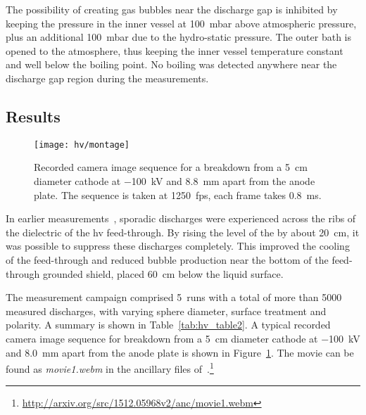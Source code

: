 The possibility of creating gas bubbles near the discharge gap is inhibited by keeping the pressure in the inner vessel at \SI{100}{\milli\bar} above atmospheric pressure, plus an additional \SI{100}{\milli\bar} due to the hydro-static pressure.
The outer bath is opened to the atmosphere, thus keeping the inner vessel temperature constant and well below the boiling point.
No boiling was detected anywhere near the discharge gap region during the measurements.


\subsection{Results}
\label{sec:studies_hv_results}

\begin{figure}[htb]
	\centering	
	\texttt{[image: hv/montage]}
	\caption[ test high-speed footage]{%
		Recorded camera image sequence for a breakdown from a \SI{5}{\centi\metre} diameter cathode at \SI{-100}{\kilo\volt} and \SI{8.8}{\milli\metre} apart from the anode plate.
		The sequence is taken at \SI{1250}{fps}, each frame takes \SI{0.8}{\milli\second}.
	}
	\label{fig:hv_images}
\end{figure}

In earlier measurements~\cite{breakdown_14}, sporadic discharges were experienced across the ribs of the dielectric of the \gls{hv} feed-through.
By rising the level of the \lar{} by about \SI{20}{\centi\metre}, it was possible to suppress these discharges completely.
This improved the cooling of the feed-through and reduced bubble production near the bottom of the feed-through grounded shield, placed \SI{60}{\centi\metre} below the liquid surface. 

The measurement campaign comprised \num{5}~runs with a total of more than \num{5000} measured discharges, with varying sphere diameter, surface treatment and polarity.
A summary is shown in Table~\ref{tab:hv_table2}.
A typical recorded camera image sequence for breakdown from a \SI{5}{\centi\metre} diameter cathode at \SI{-100}{\kilo\volt} and \SI{8.0}{\milli\metre} apart from the anode plate is shown in Figure~\ref{fig:hv_images}.
The movie can be found as \emph{movie1.webm} in the ancillary files of~\cite{breakdown_16}.\footnote{\url{http://arxiv.org/src/1512.05968v2/anc/movie1.webm}}

